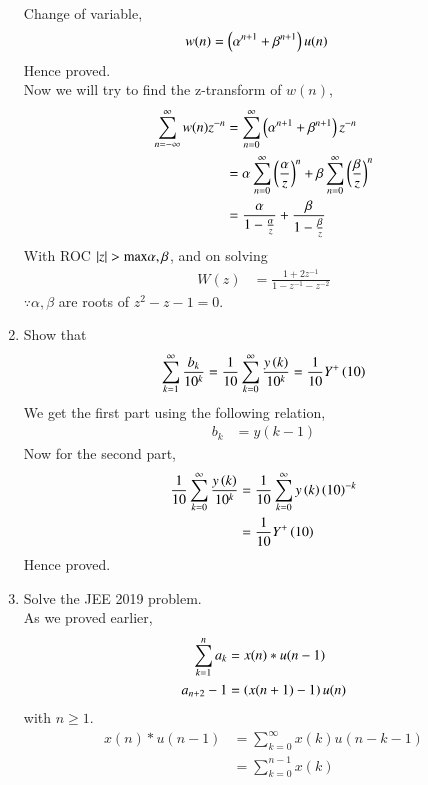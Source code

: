 \documentclass[journal,12pt,twocolumn]{IEEEtran}
\renewcommand\thesection{\arabic{section}}
\begin{document}
\begin{enumerate}[label=\thesection.\arabic*,ref=\thesection.\theenumi]
\begin{align}
   \end{align}
   Change of variable,
    \begin{align}
	    w(n) &= \left(\alpha^{n+1} + \beta^{n+1}\right)u(n)
    \end{align}
 Hence proved.\\
 Now we will try to find the z-transform of $w(n)$,
 \begin{align}
	 \sum_{n = -\infty}^{\infty}w(n)z^{-n} &= \sum_{n = 0}^{\infty}\left(\alpha^{n+1} + \beta^{n+1}\right)z^{-n} \\
					       &= \alpha\sum_{n=0}^{\infty}\left(\frac{\alpha}{z}\right)^{n} + \beta\sum_{n=0}^{\infty}\left(\frac{\beta}{z}\right)^{n} \\
					       &= \frac{\alpha}{1 - \frac{\alpha}{z}} + \frac{\beta}{1 - \frac{\beta}{z}}
 \end{align}
 With ROC $\left\vert z\right\vert > \text{max}{\alpha,\beta}$, and on solving
 \begin{align}
                W(z) &= \frac{1 + 2z^{-1}}{1 - z^{-1} - z^{-2}}
 \end{align}
 $\because \alpha , \beta$ are roots of $z^2 - z -1 = 0$.
\item Show that 
\begin{align}
	\sum_{k=1}^{\infty}\frac{b_k}{10^k} =
	\frac{1}{10}\sum_{k=0}^{\infty}\frac{y\left(k\right)}{10^k} =\frac{1}{10}Y^{+}\left(10\right)
\end{align}
\solution We get the first part using the following relation,
  \begin{align}
	  b_k &= y(k-1)
  \end{align}
 Now for the second part,
  \begin{align}
	 \frac{1}{10}\sum_{k=0}^{\infty}\frac{y\left(k\right)}{10^k} &= \frac{1}{10}\sum_{k=0}^{\infty}y\left(k\right)\left(10\right)^{-k} \\
							       &= \frac{1}{10}Y^{+}\left(10\right)
  \end{align}
Hence proved.\\
\item Solve the JEE 2019 problem.\\
\solution As we proved earlier,
 \begin{align}
   \sum_{k=1}^{n}a_k &= x(n)*u(n-1) \\
   a_{n+2} - 1 &= \left(x(n+1) - 1\right)u(n)
 \end{align}
with $n \ge 1$. 
 \begin{align}
     x(n)*u(n-1) &= \sum_{k=0}^{\infty}x(k)u(n-k-1) \\ 
                 &= \sum_{k=0}^{n-1}x(k) 

\end{align}
\end{enumerate}
\end{document}
